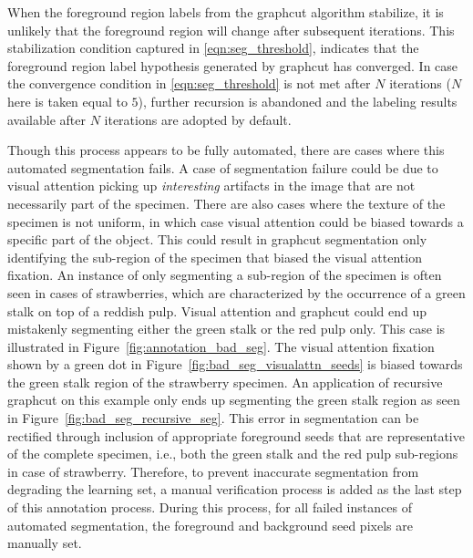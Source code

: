 When the foreground region labels from the graphcut algorithm stabilize, it is unlikely that the foreground region will change after subsequent iterations. This stabilization condition captured in \eqref{eqn:seg_threshold}, indicates that the foreground region label hypothesis generated by graphcut has converged. In case the convergence condition in \eqref{eqn:seg_threshold} is not met after $N$ iterations ($N$ here is taken equal to $5$), further recursion is abandoned and the labeling results available after $N$ iterations are adopted by default.

Though this process appears to be fully automated, there are cases where this automated segmentation fails. A case of segmentation failure could be due to visual attention picking up \emph{interesting} artifacts in the image that are not necessarily part of the specimen. There are also cases where the texture of the specimen is not uniform, in which case visual attention could be biased towards a specific part of the object. This could result in graphcut segmentation only identifying the sub-region of the specimen that biased the visual attention fixation. An instance of only segmenting a sub-region of the specimen is often seen in cases of strawberries, which are characterized by the occurrence of a green stalk on top of a reddish pulp. Visual attention and graphcut could end up mistakenly segmenting either the green stalk or the red pulp only. This case is illustrated in Figure~\ref{fig:annotation_bad_seg}. The visual attention fixation shown by a green dot in Figure~\ref{fig:bad_seg_visualattn_seeds} is 
biased towards the green stalk region of the strawberry specimen. An application of recursive graphcut on this example only ends up segmenting the green stalk region as seen in Figure~\ref{fig:bad_seg_recursive_seg}. This error in segmentation can be rectified through inclusion of appropriate foreground seeds that are representative of the complete specimen, i.e., both the green stalk and the red pulp sub-regions in case of strawberry. Therefore, to prevent inaccurate segmentation from degrading the learning set, a manual verification process is added as the last step of this annotation process. During this process, for all failed instances of automated segmentation, the foreground and background seed pixels are manually set. 
%
